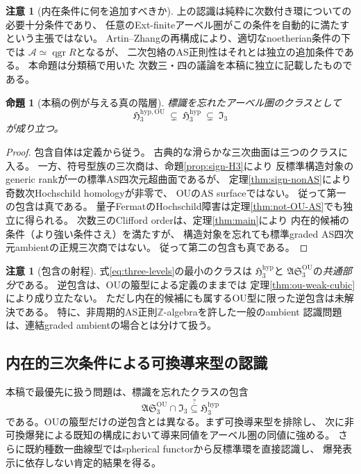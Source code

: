\documentclass[11pt,a4paper]{ltjsarticle}
\newtheorem{proposition}[theorem]{命題}
\theoremstyle{definition}
\newtheorem{remark}[theorem]{注意}
\begin{document}
\begin{remark}[内在条件に何を追加すべきか]
\label{rem:envelope-vs-category}
上の認識は純粋に次数付き環についての必要十分条件であり、
任意のExt-finiteアーベル圏がこの条件を自動的に満たすという主張ではない。
Artin--Zhangの再構成により、適切なnoetherian条件の下では
$\mathcal A\simeq\operatorname{qgr} R$となるが、
二次包絡のAS正則性はそれとは独立の追加条件である。
本命題は分類稿\cite[三次超曲面性の自動性]{Current}で用いた
次数三・四の議論を本稿に独立に記載したものである。
\end{remark}

\begin{proposition}[本稿の例が与える真の階層]\label{prop:three-levels}
標識を忘れたアーベル圏のクラスとして
\begin{equation}\label{eq:three-levels}
 \mathfrak H^{\mathrm{hyp,OU}}_3
 \ \subsetneq\ 
 \mathfrak H^{\mathrm{hyp}}_3
 \ \subsetneq\
 \mathfrak I_3
\end{equation}
が成り立つ。
\end{proposition}
\begin{proof}
包含自体は定義から従う。
古典的な滑らかな三次曲面は三つのクラスに入る。
一方、符号型族の三次商は、命題\ref{prop:sign-H3}により
反標準構造対象のgeneric rankが一の標準AS四次元超曲面であるが、
定理\ref{thm:sign-nonAS}により奇数次Hochschild homologyが非零で、
OUのAS surfaceではない。
従って第一の包含は真である。
量子FermatのHochschild障害は定理\ref{thm:not-OU-AS}でも独立に得られる。
次数三のClifford orderは、定理\ref{thm:main}により
内在的候補の条件（より強い条件さえ）を満たすが、
構造対象を忘れても標準graded AS四次元ambientの正規三次商ではない。
従って第二の包含も真である。
\end{proof}

\begin{remark}[包含の射程]\label{rem:ou-hyp-scope}
式\eqref{eq:three-levels}の最小のクラスは
$\mathfrak H^{\mathrm{hyp}}_3$と
$\mathfrak{AS}^{\mathrm{OU}}_3$の\emph{共通部分}である。
逆包含は、OUの箙型による定義のままでは
定理\ref{thm:ou-weak-cubic}により成り立たない。
ただし内在的候補にも属するOU型に限った逆包含は未解決である。
特に、非周期的AS正則$\mathbb Z$-algebraを許した一般のambient
認識問題は、連結graded ambientの場合とは分けて扱う。
\end{remark}

\subsection{内在的三次条件による可換導来型の認識}
\label{subsec:recognition-commutative}
本稿で最優先に扱う問題は、標識を忘れたクラスの包含
\begin{equation}\label{eq:intrinsic-ou-question}
 \mathfrak{AS}^{\mathrm{OU}}_3\cap\mathfrak I_3
 \stackrel{?}{\subseteq}\mathfrak H^{\mathrm{hyp}}_3
\end{equation}
である。OUの箙型だけの逆包含とは異なる。まず可換導来型を排除し、
次に非可換爆発による既知の構成において導来同値をアーベル圏の同値に強める。
さらに既約種数一曲線型ではspherical functorから反標準環を直接認識し、
爆発表示に依存しない肯定的結果を得る。
\end{document}
